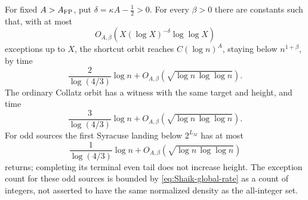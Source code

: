 \begin{corollary}
\label{cor:Shaik-fixed-rate-clocks}
For fixed \(A>A_{\rm FP}\), put \(\delta=\kappa A-\tfrac12>0\).
For every \(\beta>0\) there are constants such that, with at most
\begin{equation}\label{eq:Shaik-global-rate}
 O_{A,\beta}\left(
 X(\log X)^{-\delta}\log\log X\right)
\end{equation}
exceptions up to \(X\), the shortcut orbit reaches
\(C(\log n)^A\), staying below \(n^{1+\beta}\), by time
\[
 \frac{2}{\log(4/3)}\log n+
 O_{A,\beta}(\sqrt{\log n\,\log\log n}).
\]
The ordinary Collatz orbit has a witness with the same target and
height, and time
\[
 \frac{3}{\log(4/3)}\log n+
 O_{A,\beta}(\sqrt{\log n\,\log\log n}).
\]
For odd sources the first Syracuse landing below \(2^{L_M}\) has
at most
\[
 \frac1{\log(4/3)}\log n+
 O_{A,\beta}(\sqrt{\log n\,\log\log n})
\]
returns; completing its terminal even tail does not increase height.
The exception count for these odd sources is bounded by
\eqref{eq:Shaik-global-rate} as a count of integers, not asserted to
have the same normalized density as the all-integer set.
\end{corollary}
